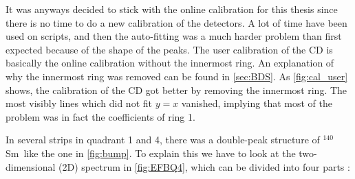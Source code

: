 \documentclass[twoside,english]{uiofysmaster/uiofysmaster}
\newcommand{\Sm}{$^{140}$Sm} %
\let\orgautoref\autoref
\renewcommand{\autoref}
        {%
		 \def\subsectionautorefname{Section}%
		 \def\subsubsectionautorefname{Section}%
          \orgautoref}
\begin{document}
It was anyways decided to stick with the online calibration for this thesis since there is no time to do a new calibration of the detectors. 
A lot of time have been used on scripts, and then the auto-fitting was a much harder problem than first expected because of the shape of the peaks.
The user calibration of the CD is basically the online calibration without the innermost ring. 
An explanation of why the innermost ring was removed can be found in  \autoref{sec:BDS}. 
As \autoref{fig:cal_user} shows, the calibration of the CD got better by removing the innermost ring. 
The most visibly lines which did not fit $y = x$ vanished, implying that most of the problem was in fact the coefficients of ring 1. 

In several strips in quadrant 1 and 4, there was a double-peak structure of \Sm\ like the one in \autoref{fig:bump}. 
To explain this we have to look at the two-dimensional (2D) spectrum in \autoref{fig:EFBQ4}, which can be divided into four parts \cite{Rosiak}:
\end{document}
